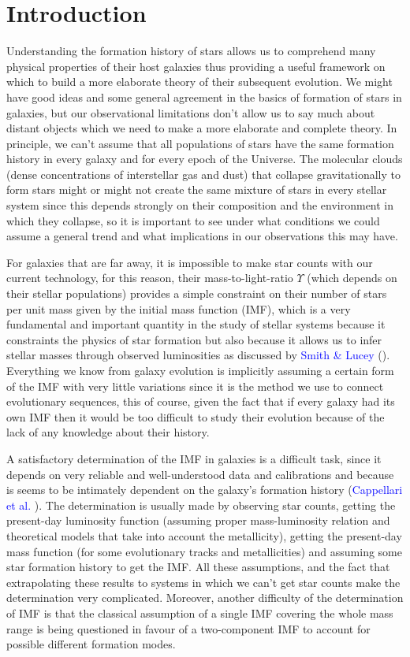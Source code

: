 \chapter{Introduction}

Understanding the formation history of stars allows us to comprehend many physical properties of their host galaxies thus providing a useful framework on which to build a more elaborate theory of their subsequent evolution. We might have good ideas and some general agreement in the basics of formation of stars in galaxies, but our observational limitations don't allow us to say much about distant objects which we need to make a more elaborate and complete theory. In principle, we can't assume that all populations of stars have the same formation history in every galaxy and for every epoch of the Universe. The molecular clouds (dense concentrations of interstellar gas and dust) that collapse gravitationally to form stars might or might not create the same mixture of stars in every stellar system since this depends strongly on their composition and the environment in which they collapse, so it is important to see under what conditions we could assume a general trend and what implications in our observations this may have.

For galaxies that are far away, it is impossible to make star counts with our current technology, for this reason, their mass-to-light-ratio $\Upsilon$ (which depends on their stellar populations) provides a simple constraint on their number of stars per unit mass given by the initial mass function (IMF), which is a very fundamental and important quantity in the study of stellar systems because it constraints the physics of star formation but also because it allows us to infer stellar masses through observed luminosities as discussed by \textcolor{blue}{Smith \& Lucey} (\citeyear{Reference7}). Everything we know from galaxy evolution is implicitly assuming a certain form of the IMF with very little variations since it is the method we use to connect evolutionary sequences, this of course, given the fact that if every galaxy had its own IMF then it would be too difficult to study their evolution because of the lack of any knowledge about their history. 

A satisfactory determination of the IMF in galaxies is a difficult task, since it depends on very reliable and well-understood data and calibrations and because is seems to be intimately dependent on
the galaxy’s formation history (\textcolor{blue}{Cappellari et al.} \citeyear{Reference19}). The determination is usually made by observing star counts, getting the present-day luminosity function (assuming proper mass-luminosity relation and theoretical models that take into account the metallicity), getting the present-day mass function (for some evolutionary tracks and metallicities) and assuming some star formation history to get the IMF. All these assumptions, and the fact that extrapolating these results to systems in which we can't get star counts make the determination very complicated. Moreover, another difficulty of the determination of IMF is that the classical assumption of a single IMF covering the whole mass range is being questioned in favour of a two-component IMF to account for possible different formation modes.

